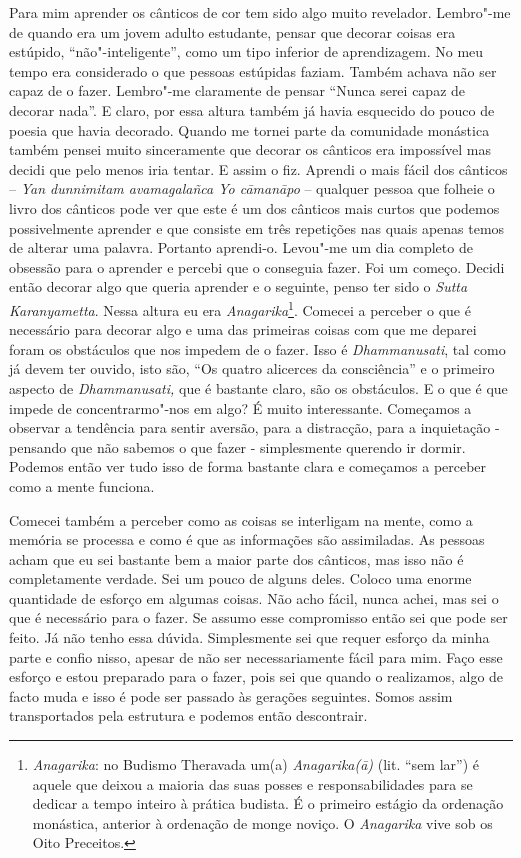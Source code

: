 Para mim aprender os cânticos de cor tem sido algo muito revelador.
Lembro"-me de quando era um jovem adulto estudante, pensar que decorar
coisas era estúpido, ``não"-inteligente'', como um tipo inferior de
aprendizagem. No meu tempo era considerado o que pessoas estúpidas
faziam. Também achava não ser capaz de o fazer. Lembro"-me claramente de
pensar ``Nunca serei capaz de decorar nada''. E claro, por essa altura
também já havia esquecido do pouco de poesia que havia decorado. Quando
me tornei parte da comunidade monástica também pensei muito sinceramente
que decorar os cânticos era impossível mas decidi que pelo menos iria
tentar. E assim o fiz. Aprendi o mais fácil dos cânticos -- \emph{Yan
dunnimitam avamagalañca Yo cāmanāpo} -- qualquer pessoa que folheie o
livro dos cânticos pode ver que este é um dos cânticos mais curtos que
podemos possivelmente aprender e que consiste em três repetições nas
quais apenas temos de alterar uma palavra. Portanto aprendi-o. Levou"-me
um dia completo de obsessão para o aprender e percebi que o conseguia
fazer. Foi um começo. Decidi então decorar algo que queria aprender e o
seguinte, penso ter sido o \emph{Sutta Karanyametta}. Nessa altura eu
era \emph{Anagarika}\footnote{%
  \emph{Anagarika}: no Budismo Theravada um(a) \emph{Anagarika(ā)}
  (lit. ``sem lar'') é aquele que deixou a maioria das suas posses e
  responsabilidades para se dedicar a tempo inteiro à prática budista. É o
  primeiro estágio da ordenação monástica, anterior à ordenação de monge
  noviço. O \emph{Anagarika} vive sob os Oito Preceitos.
}.
Comecei a perceber o que é necessário para
decorar algo e uma das primeiras coisas com que me deparei foram os
obstáculos que nos impedem de o fazer. Isso é \emph{Dhammanusati}, tal
como já devem ter ouvido, isto são, ``Os quatro alicerces da consciência''
e o primeiro aspecto de \emph{Dhammanusati,} que é bastante claro, são
os obstáculos. E o que é que impede de concentrarmo"-nos em algo? É muito
interessante. Começamos a observar a tendência para sentir aversão, para
a distracção, para a inquietação - pensando que não sabemos o que fazer
- simplesmente querendo ir dormir. Podemos então ver tudo isso de forma
bastante clara e começamos a perceber como a mente funciona.

Comecei também a perceber como as coisas se interligam na mente, como a
memória se processa e como é que as informações são assimiladas. As
pessoas acham que eu sei bastante bem a maior parte dos cânticos, mas
isso não é completamente verdade. Sei um pouco de alguns deles. Coloco
uma enorme quantidade de esforço em algumas coisas. Não acho fácil,
nunca achei, mas sei o que é necessário para o fazer. Se assumo esse
compromisso então sei que pode ser feito. Já não tenho essa dúvida.
Simplesmente sei que requer esforço da minha parte e confio nisso,
apesar de não ser necessariamente fácil para mim. Faço esse esforço e
estou preparado para o fazer, pois sei que quando o realizamos, algo de
facto muda e isso é pode ser passado às gerações seguintes. Somos assim
transportados pela estrutura e podemos então descontrair.

